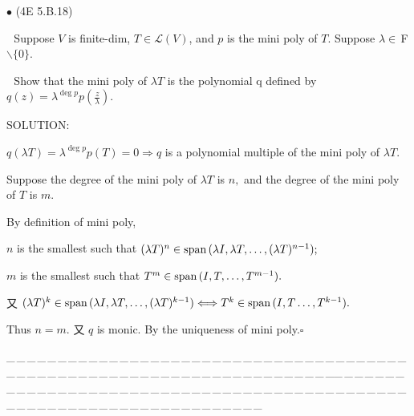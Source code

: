 \documentclass[a4paper, 11pt, UTF8]{article}
\def\Spn{\textup{span}\,}
\def\Lm{\mathcal{L}}
\def\Fbfc{$\,{\timesbf F}$}
\begin{document}
\begin{large}
{\small $\bullet$} ({\normalsize4E 5.B.18})\par\,\, {\timessl\Large 
Suppose $V$ is finite-dim, $T\in \Lm(V)$, and $p$ is the mini poly of $T$. Suppose $\lambda \in\Fbfc\backslash\{0\}$.}\par\,\,
{\timessl\Large Show that the mini poly of $\lambda T$ is the polynomial q defined by $q(z) = \lambda^{\deg p} p(\frac{z}{\lambda})$.
}\par
{\timesbf S\footnotesize{OLUTION:}}\par\quad
$q(\lambda T)=\lambda^{\deg p}p(T)=0\Rightarrow q$ is a polynomial multiple of the mini poly of $\lambda T.$\par\quad
Suppose the degree of the mini poly of $\lambda T$ is $n,$ and the degree of the mini poly of $T$ is $m.$\par\quad
By definition of mini poly,\par\quad
$n$ is the smallest such that $(\lambda T)^{n}\in\Spn(\lambda I,\lambda T,\dots,(\lambda T)^{n-1});$\par\quad
$m$ is the smallest such that $T^m\in\Spn(I,T,\dots,T^{m-1}).$\par\quad
又 $(\lambda T)^k\in\Spn(\lambda I,\lambda T,\dots,(\lambda T)^{k-1})\Longleftrightarrow T^k\in\Spn(I,T\dots,T^{k-1}).$\par\quad
Thus $n=m.$ 又 $q$ is monic. By the uniqueness of mini poly.\quad$\square$\par
{\tiny \_\,\_\,\_\,\_\,\_\,\_\,\_\,\_\,\_\,\_\,\_\,\_\,\_\,\_\,\_\,\_\,\_\,\_\,\_\,\_\,\_\,\_\,\_\,\_\,\_\,\_\,\_\,\_\,\_\,\_\,\_\,\_\,\_\,\_\,\_\,\_\,\_\,\_\,\_\,\_\,\_\,\_\,\_\,\_\,\_\,\_\,\_\,\_\,\_\,\_\,\_\,\_\,\_\,\_\,\_\,\_\,\_\,\_\,\_\,\_\,\_\,\_\,\_\,\_\,\_\,\_\,\_\,\_\,\_\,\_\,\_\_\,\_\,\_\,\_\,\_\,\_\,\_\,\_\,\_\,\_\,\_\,\_\,\_\,\_\,\_\,\_\,\_\,\_\,\_\,\_\,\_\,\_\,\_\,\_\,\_\,\_\,\_\,\_\,\_\,\_\,\_\,\_\,\_\,\_\,\_\,\_\,\_\,\_\,\_\,\_\,\_\,\_\,\_\,\_\,\_\,\_\,\_\,\_\,\_\,\_\,\_\,\_\,\_\,\_\,\_\,\_\,\_\,\_\,\_\,\_\,\_\,\_\,\_\,\_\,\_\,\_\,\_\,\_\,\_\,\_\,\_}\par{\small\,\par}


\end{large}
\end{document}
